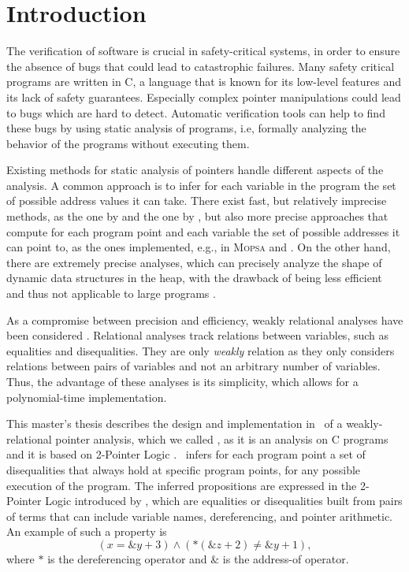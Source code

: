 
\chapter{Introduction}\label{chapter:introduction}

The verification of software is crucial in safety-critical systems, in order to ensure the absence of bugs that could lead to catastrophic failures.
Many safety critical programs are written in C, a language that is known for its low-level features and its lack of safety guarantees.
Especially complex pointer manipulations could lead to bugs which are hard to detect.
Automatic verification tools can help to find these bugs by using static analysis of programs,
i.e, formally analyzing the behavior of the programs without executing them.

Existing methods for static analysis of pointers handle different aspects of the analysis.
A common approach is to infer for each variable in the program the set of possible address values it can take.
There exist fast, but relatively imprecise methods, as the one by \textcite{Steensgaard} and the one by \textcite{Andersen}, but also more precise approaches that compute for each program point and each variable the set of possible addresses it can point to, as the ones implemented, e.g., in \textsc{Mopsa} \cite{mopsa} and \goblint \cite{goblint}.
On the other hand, there are extremely precise analyses, which can precisely analyze the shape of dynamic data structures in the heap,
with the drawback of being less efficient and thus not applicable to large programs
\cite{rivalpapers,kreiker,predator}.

As a compromise between precision and efficiency,
weakly relational analyses have been considered \cite{octagon,SeidlETS2023}.
Relational analyses track relations between variables, such as equalities and disequalities.
They are only \emph{weakly} relation as they only considers relations between pairs of variables and not an arbitrary number of variables.
Thus, the advantage of these analyses is its simplicity, which allows for a polynomial-time implementation.

This master's thesis describes the design and implementation in \goblint\ of a weakly-relational pointer analysis,
which we called \cpo, as it is an analysis on C programs and it is based on 2-Pointer Logic \cite{2pointer}.
\cpo\ infers for each program point a set of disequalities that always hold at specific program points,
for any possible execution of the program.
The inferred propositions are expressed in the 2-Pointer Logic introduced by \textcite{2pointer}, which
are equalities or disequalities built from pairs of terms that can
include variable names, dereferencing, and pointer arithmetic.
An example of such a property is 
\begin{equation}\label{example:introduction}
    (x = \&y + 3) \land (*(\&z + 2) \neq \&y + 1),
\end{equation}
where $*$ is the dereferencing operator and $\&$ is the address-of operator.

